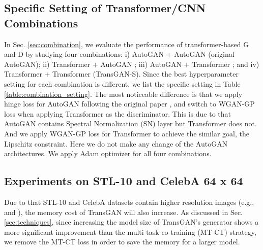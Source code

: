 \documentclass{article}
\begin{document}
\subsection{Specific Setting of Transformer/CNN Combinations}
\label{sec:Appendix_A}
In Sec. \ref{sec:combination}, we evaluate the performance of transformer-based G and D by studying four combinations: i) AutoGAN  + AutoGAN  (original AutoGAN);  ii) Transformer  + AutoGAN ; iii) AutoGAN  + Transformer ; and iv) Transformer  + Transformer  (TransGAN-S). Since the best hyperparameter setting for each combination is different, we list the specific setting in Table \ref{table:combination_setting}. The most noticeable difference is that we apply hinge loss for AutoGAN  following the original paper \cite{gong2019autogan}, and switch to WGAN-GP \cite{gulrajani2017improved} loss when applying Transformer  as the discriminator. This is due to that AutoGAN  contains Spectral Normalization (SN) \cite{miyato2018spectral} layer but Transformer  does not. And we apply WGAN-GP loss for Transformer  to achieve the similar goal, the Lipschitz constraint. 
Here we do not make any change of the AutoGAN architectures. We apply Adam optimizer for all four combinations.

\begin{table}[h]
\caption{Detailed setting of four combinations.}
\label{table:combination_setting}
\vskip 0.15in
\centering
\begin{center}
\begin{small}
\end{small}
\end{center}
\vskip -0.1in
\end{table}

\subsection{Experiments on STL-10 and CelebA 64 x 64}
Due to that STL-10 and CelebA datasets contain higher resolution images (e.g.,  and ), the memory cost of TransGAN will also increase. As discussed in Sec. \ref{sec:techniques}, since increasing the model size of TransGAN's generator shows a more significant improvement than the multi-task co-training (MT-CT) strategy, we remove the MT-CT loss in order to save the memory for a larger model.
\end{document}

